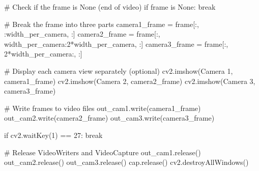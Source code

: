 \documentclass[
  letterpaper,
  DIV=11,
  numbers=noendperiod]{scrreprt}
\newenvironment{Shaded}{\begin{snugshade}}{\end{snugshade}}
\newcommand{\CommentTok}[1]{\textcolor[rgb]{0.37,0.37,0.37}{#1}}
\newcommand{\ControlFlowTok}[1]{\textcolor[rgb]{0.00,0.23,0.31}{#1}}
\newcommand{\DecValTok}[1]{\textcolor[rgb]{0.68,0.00,0.00}{#1}}
\newcommand{\KeywordTok}[1]{\textcolor[rgb]{0.00,0.23,0.31}{#1}}
\newcommand{\NormalTok}[1]{\textcolor[rgb]{0.00,0.23,0.31}{#1}}
\newcommand{\OperatorTok}[1]{\textcolor[rgb]{0.37,0.37,0.37}{#1}}
\newcommand{\StringTok}[1]{\textcolor[rgb]{0.13,0.47,0.30}{#1}}
\newcommand{\VariableTok}[1]{\textcolor[rgb]{0.07,0.07,0.07}{#1}}
\begin{document}
\begin{Shaded}
\begin{Highlighting}[]
        \CommentTok{\# Check if the frame is None (end of video)}
        \ControlFlowTok{if}\NormalTok{ frame }\KeywordTok{is} \VariableTok{None}\NormalTok{:}
            \ControlFlowTok{break}

        \CommentTok{\# Break the frame into three parts}
\NormalTok{        camera1\_frame }\OperatorTok{=}\NormalTok{ frame[:, :width\_per\_camera, :]}
\NormalTok{        camera2\_frame }\OperatorTok{=}\NormalTok{ frame[:, width\_per\_camera:}\DecValTok{2}\OperatorTok{*}\NormalTok{width\_per\_camera, :]}
\NormalTok{        camera3\_frame }\OperatorTok{=}\NormalTok{ frame[:, }\DecValTok{2}\OperatorTok{*}\NormalTok{width\_per\_camera:, :]}

        \CommentTok{\# Display each camera view separately (optional)}
\NormalTok{        cv2.imshow(}\StringTok{\textquotesingle{}Camera 1\textquotesingle{}}\NormalTok{, camera1\_frame)}
\NormalTok{        cv2.imshow(}\StringTok{\textquotesingle{}Camera 2\textquotesingle{}}\NormalTok{, camera2\_frame)}
\NormalTok{        cv2.imshow(}\StringTok{\textquotesingle{}Camera 3\textquotesingle{}}\NormalTok{, camera3\_frame)}

        \CommentTok{\# Write frames to video files}
\NormalTok{        out\_cam1.write(camera1\_frame)}
\NormalTok{        out\_cam2.write(camera2\_frame)}
\NormalTok{        out\_cam3.write(camera3\_frame)}

        \ControlFlowTok{if}\NormalTok{ cv2.waitKey(}\DecValTok{1}\NormalTok{) }\OperatorTok{==} \DecValTok{27}\NormalTok{:}
            \ControlFlowTok{break}

    \CommentTok{\# Release VideoWriters and VideoCapture}
\NormalTok{    out\_cam1.release()}
\NormalTok{    out\_cam2.release()}
\NormalTok{    out\_cam3.release()}
\NormalTok{    cap.release()}
\NormalTok{    cv2.destroyAllWindows()}
\end{Highlighting}
\end{Shaded}
\end{document}
